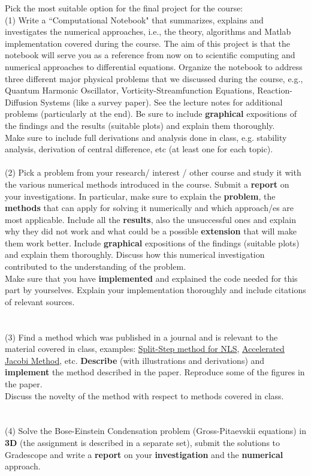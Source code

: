 \documentclass[11pt]{article}
\begin{document}
Pick the most suitable option for the final project for the course: \\
(1) Write a ``Computational Notebook" that summarizes, explains
and investigates the numerical approaches, i.e., the theory, algorithms and Matlab implementation covered during the course. The aim of this project
is that the
 notebook  will
serve you as a  reference from now on 
to  scientific computing and numerical approaches to differential equations. Organize the notebook
to address   three different major physical problems that we discussed during the
course, e.g., Quantum Harmonic
Oscillator, Vorticity-Streamfunction Equations, Reaction-Diffusion Systems (like a survey paper).
See the lecture notes for additional problems (particularly
at the end).   Be sure to include \textbf{graphical} expositions of the findings and
the results (suitable plots) and explain  them   thoroughly. \\
Make sure to include full derivations and analysis done  in class, e.g. stability analysis, derivation of central difference, etc (at least one for each topic). 
\\\\
(2) Pick a problem from your research/ interest / other course and study it  with the various numerical methods introduced in the course. Submit a \textbf{report} on your investigations. In particular, make sure to explain the
\textbf{problem}, the \textbf{methods} that can apply for solving it numerically and which
approach/es are most applicable.  Include all the \textbf{results}, also the unsuccessful
ones and explain why they did not work and what could be a possible \textbf{extension}
that will make them work better.     Include \textbf{graphical} expositions of the findings  (suitable plots) and  explain them thoroughly.
Discuss how this numerical investigation contributed to the understanding of the problem.\\
Make sure that you have  \textbf{implemented} and explained the code needed for this part by yourselves. Explain your implementation thoroughly and include citations of relevant sources.\\
\\\\
(3) Find a method which was published in a journal and is relevant to the material covered in class, examples: \href{http://www.jstor.org/stable/pdfplus/2157521.pdf?acceptTC=true&jpdConfirm=true}{Split-Step method for NLS}, \href{http://engineering.jhu.edu/fsag/wp-content/uploads/sites/23/2013/10/JCP_revised_WebPost.pdf}{Accelerated Jacobi Method}, etc. \textbf{Describe} (with illustrations and derivations) and \textbf{implement} the method described in the paper. Reproduce some of the figures in the paper.
\\
Discuss the novelty of the method with respect to methods covered in class. 
\\ \\ \\
(4) Solve the Bose-Einstein Condensation problem (Gross-Pitaevskii equations) in \textbf{3D} (the assignment is described in a separate set), submit the solutions to Gradescope and write a \textbf{report} on your \textbf{investigation} and the \textbf{numerical} approach.
\end{document}

